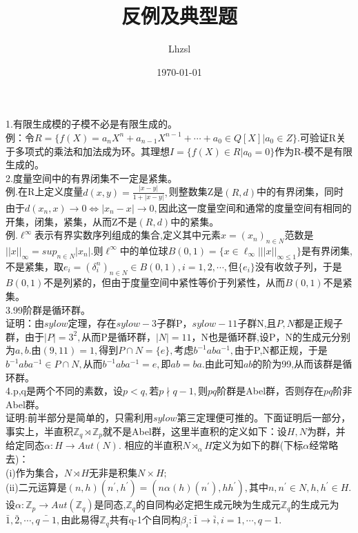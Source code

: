 \documentclass[UTF8]{article}
\title{反例及典型题}
\author{Lhzsl}
\date{\today }
\begin{document}
		\maketitle
	1.有限生成模的子模不必是有限生成的。\\
	例：令$R=\{f(X)=a_{n}X^{n}+a_{n-1}X^{n-1}+\cdots+a_{0}\in Q[X]|a_{0}\in Z\}.$可验证R关于多项式的乘法和加法成为环。其理想$I=\{f(X)\in R|a_{0}=0\}$作为R-模不是有限生成的。\\
	2.度量空间中的有界闭集不一定是紧集。\\
	例.在R上定义度量$d(x,y)=\frac{|x-y|}{1+|x-y|},$则整数集Z是$(R,d)$中的有界闭集，同时由于$d(x_{n},x)\rightarrow 0\iff |x_{n}-x|\rightarrow 0,$因此这一度量空间和通常的度量空间有相同的开集，闭集，紧集，从而Z不是$(R,d)$中的紧集。\\
	例.$\ell^{\infty}$表示有界实数序列组成的集合,定义其中元素$x=(x_{n})_{n\in N}$范数是$||x||_{\infty}=sup_{n\in N}|x_{n}|.$则$\ell^{\infty}$中的单位球$B(0,1)=\{x\in \ell_{\infty}|||x||_{\infty \leq 1}\}$是有界闭集,不是紧集，取$e_{i}=(\delta_{i}^{n} )_{n\in N}\in B(0,1),i=1,2,\cdots,$但$\{e_{i}\}$没有收敛子列，于是$B(0,1)$不是列紧的，但由于度量空间中紧性等价于列紧性，从而$B(0,1)$不是紧集。\\
	3.99阶群是循环群。\\
	证明：由$sylow$定理，存在$sylow-3$子群P，$sylow-11$子群N,且$P,N$都是正规子群，由于$|P|=3^{2},$从而P是循环群，$|N|=11$，N也是循环群,设P，N的生成元分别为$a,b.$由$(9,11)=1,$得到$P\cap N=\{e\},$考虑$b^{-1}aba^{-1},$由于P,N都正规，于是$b^{-1}aba^{-1}\in P\cap N,$从而$b^{-1}aba^{-1}=e,$即$ab=ba.$由此可知$ab$的阶为99,从而该群是循环群。\\
	4.p,q是两个不同的素数，设$p<q,$若$p\nmid q-1,$则$pq$阶群是Abel群，否则存在$pq$阶非Abel群。\\
	证明:前半部分是简单的，只需利用$sylow$第三定理便可推的。下面证明后一部分，事实上，半直积$\mathbb{Z}_{q}\rtimes\mathbb{Z}_{p}$就不是Abel群，这里半直积的定义如下：设$H,N$为群，并给定同态$\alpha :H\rightarrow Aut(N).$
	相应的半直积$N\rtimes_{\alpha}H$定义为如下的群(下标$\alpha $经常略去)：\\
	(i)作为集合，$N\rtimes H$无非是积集$N\times H;$\\
	(ii)二元运算是$(n,h)(n^{'},h^{'})=(n\alpha(h)(n^{'}),hh^{'}),$其中$n,n^{'}\in N,h,h^{'}\in H.$\\
	设$\alpha:\mathbb{Z}_{p}\rightarrow Aut(\mathbb{Z}_{q})$是同态,$\mathbb{Z}_{q}$的自同构必定把生成元映为生成元$\mathbb{Z}_{q}$的生成元为$\bar{1},\bar{2},\cdots,\bar{q-1},$由此易得$\mathbb{Z}_{q}$共有q-1个自同构$\beta_{i}:\bar{1}\rightarrow \bar{i},i=1,\cdots,q-1.$\\
\end{document}
